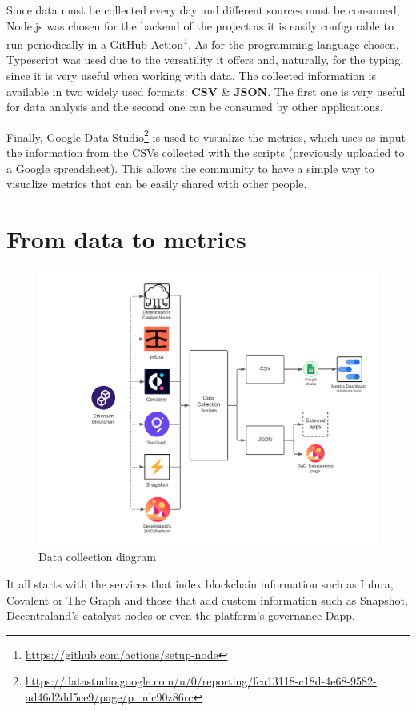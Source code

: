 \documentclass[MSE,Master,english]{twbook}%
\begin{document}
Since data must be collected every day and different sources must be consumed, Node.js was chosen for the backend of the project as it is easily configurable to run periodically in a GitHub Action\footnote{\url{https://github.com/actions/setup-node}}. As for the programming language chosen, Typescript was used due to the versatility it offers and, naturally, for the typing, since it is very useful when working with data. The collected information is available in two widely used formats: \textbf{CSV} \& \textbf{JSON}. The first one is very useful for data analysis and the second one can be consumed by other applications.

Finally, Google Data Studio\footnote{\url{https://datastudio.google.com/u/0/reporting/fca13118-c18d-4e68-9582-ad46d2dd5ce9/page/p_nlc90z86rc}} is used to visualize the metrics, which uses as input the information from the CSVs collected with the scripts (previously uploaded to a Google spreadsheet). This allows the community to have a simple way to visualize metrics that can be easily shared with other people.

\section{From data to metrics}
\begin{figure}[H]
  \centering
  \includegraphics[width=\textwidth]{diagrama.png}
  \caption{Data collection diagram}
  \label{fig:diagram}
\end{figure}

It all starts with the services that index blockchain information such as Infura, Covalent or The Graph and those that add custom information such as Snapshot, Decentraland's catalyst nodes or even the platform's governance Dapp.
\end{document}
